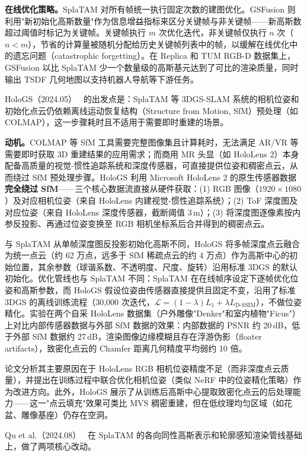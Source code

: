 \textbf{在线优化策略。}SplaTAM 对所有帧统一执行固定次数的建图优化。GSFusion 则利用"新初始化高斯数量"作为信息增益指标来区分关键帧与非关键帧——新高斯数超过阈值时标记为关键帧。关键帧执行 $m$ 次优化迭代，非关键帧仅执行 $n$ 次（$n < m$），节省的计算量被随机分配给历史关键帧列表中的帧，以缓解在线优化中的遗忘问题（catastrophic forgetting）。在 Replica 和 TUM RGB-D 数据集上，GSFusion 以比 SplaTAM 少一个数量级的高斯基元达到了可比的渲染质量，同时输出 TSDF 几何地图以支持机器人导航等下游任务。

HoloGS（2024.05）~\cite{2405_02005} 的出发点是：SplaTAM 等 3DGS-SLAM 系统的相机位姿和初始化点云仍依赖离线运动恢复结构（Structure from Motion, SfM）预处理（如 COLMAP），这一步骤耗时且不适用于需要即时重建的场景。

\textbf{动机。}COLMAP 等 SfM 工具需要完整图像集且计算耗时，无法满足 AR/VR 等需要即时获取 3D 重建结果的应用需求；而商用 MR 头显（如 HoloLens 2）本身配备高质量的视觉-惯性追踪系统和深度传感器，可直接提供位姿和稠密点云，从而绕过 SfM 预处理步骤。HoloGS 利用 Microsoft HoloLens 2 的原生传感器数据\textbf{完全绕过 SfM}——三个核心数据流直接从硬件获取：(1) RGB 图像（$1920 \times 1080$）及对应相机位姿（来自 HoloLens 内建视觉-惯性追踪系统）；(2) ToF 深度图及对应位姿（来自 HoloLens 深度传感器，截断阈值 3\,m）；(3) 将深度图逐像素按内参反投影、再通过位姿变换至 RGB 相机坐标系后合并得到的稠密点云。

与 SplaTAM 从单帧深度图反投影初始化高斯不同，HoloGS 将多帧深度点云融合为统一点云（约 62 万点，远多于 SfM 稀疏点云的约 4 万点）作为高斯中心的初始位置，其余参数（球谐系数、不透明度、尺度、旋转）沿用标准 3DGS 的默认初始化。优化管线也与 SplaTAM 不同：SplaTAM 在在线帧序设定下逐帧优化位姿和高斯参数，而 HoloGS 假设位姿由传感器直接提供且固定不变，沿用了标准 3DGS 的离线训练流程（30,000 次迭代，$\mathcal{L} = (1-\lambda)L_1 + \lambda L_{\text{D-SSIM}}$），不做位姿精化。实验在两个自采 HoloLens 数据集（户外雕像"Denker"和室内植物"Ficus"）上对比内部传感器数据与外部 SfM 数据的效果：内部数据的 PSNR 约 20\,dB，低于外部 SfM 数据约 27\,dB，渲染图像边缘模糊且存在浮游伪影（floater artifacts），致密化点云的 Chamfer 距离几何精度平均弱约 10 倍。

论文分析其主要原因在于 HoloLens RGB 相机位姿精度不足（而非深度点云质量），并提出在训练过程中联合优化相机位姿（类似 NeRF 中的位姿精化策略）作为改进方向。此外，HoloGS 展示了从训练后高斯中心提取致密化点云的后处理能力——这一"点云填充"效果可类比 MVS 稠密重建，但在低纹理均匀区域（如花盆、雕像基座）仍存在空洞。

Qu et al.（2024.08）~\cite{2408_05635} 在 SplaTAM 的各向同性高斯表示和轮廓感知渲染管线基础上，做了两项核心改动。

